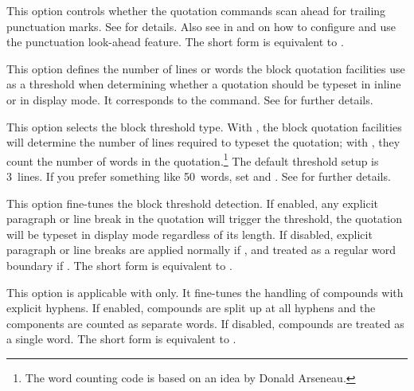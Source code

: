 \documentclass{ltxdockit}[2010/09/26]
\begin{document}
\begin{optionlist}

This option controls whether the quotation commands scan ahead for trailing punctuation marks. See  for details. Also see  in  and  on how to configure and use the punctuation look-ahead feature. The short form  is equivalent to .


This option defines the number of lines or words the block quotation facilities use as a threshold when determining whether a quotation should be typeset in inline or in display mode. It corresponds to the  command. See  for further details.


This option selects the block threshold type. With , the block quotation facilities will determine the number of lines required to typeset the quotation; with , they count the number of words in the quotation.\footnote{The word counting code is based on an idea by Donald Arseneau.} The default threshold setup is 3~lines. If you prefer something like 50~words, set  and . See  for further details.


This option fine-tunes the block threshold detection. If enabled, any explicit paragraph or line break in the quotation will trigger the threshold, \ie the quotation will be typeset in display mode regardless of its length. If disabled, explicit paragraph or line breaks are applied normally if , and treated as a regular word boundary if . The short form  is equivalent to .


This option is applicable with  only. It fine-tunes the handling of compounds with explicit hyphens. If enabled, compounds are split up at all hyphens and the components are counted as separate words. If disabled, compounds are treated as a single word. The short form  is equivalent to .


\end{optionlist}
\end{document}
